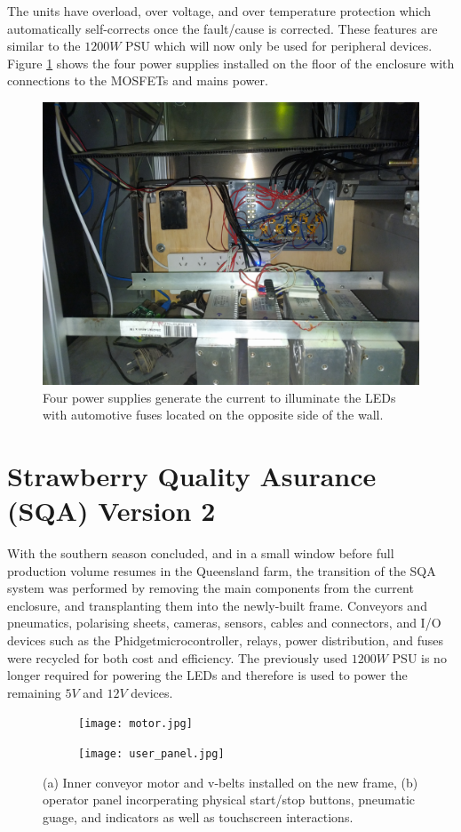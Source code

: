 \documentclass[fleqn,twoside,12pt]{report}
\begin{document}
The units have overload, over voltage, and over temperature protection which automatically self-corrects once the fault/cause is corrected. These features are similar to the $1200W$ PSU which will now only be used for peripheral devices. Figure \ref{fig:mosfet_power_supply} shows the four power supplies installed on the floor of the enclosure with connections to the MOSFETs and mains power.

\begin{figure}[h]
	\centering
	\includegraphics[width=.5\linewidth]{mosfet_power_supply.jpg}
	\caption{Four power supplies generate the current to illuminate the LEDs with automotive fuses located on the opposite side of the wall.}
	\label{fig:mosfet_power_supply}
\end{figure}%




\section{Strawberry Quality Asurance (SQA) Version 2}

With the southern season concluded, and in a small window before full production volume resumes in the Queensland farm, the transition of the SQA system was performed by removing the main components from the current enclosure, and transplanting them into the newly-built frame. Conveyors and pneumatics, polarising sheets, cameras, sensors, cables and connectors, and I/O devices such as the Phidget\texttrademark microcontroller, relays, power distribution, and fuses were recycled for both cost and efficiency. The previously used $1200W$ PSU is no longer required for powering the LEDs and therefore is used to power the remaining $5V$ and $12V$ devices.


\begin{figure}[h]
	\centering
	\begin{subfigure}{0.5\textwidth}
		\centering
		\texttt{[image: motor.jpg]}
		\caption{}
		\label{fig:motor}
	\end{subfigure}%
	\begin{subfigure}{0.5\textwidth}
		\centering
		\texttt{[image: user\_panel.jpg]}
		\caption{}
		\label{fig:user_panel}
	\end{subfigure}%
	\caption{(a) Inner conveyor motor and v-belts installed on the new frame, (b) operator panel incorperating physical start/stop buttons, pneumatic guage, and indicators as well as touchscreen interactions.}
	\label{}
\end{figure}
\end{document}
